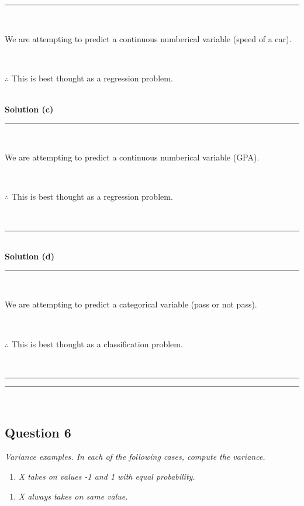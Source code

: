 \documentclass{article}
\begin{document}
\noindent\rule{\textwidth}{0.4pt}\\

\parbox{\textwidth}{We are attempting to predict a continuous numberical variable (speed of a car).}\\

\parbox{\textwidth}{$\therefore$ This is best thought as a regression problem.}\\

\textbf{Solution (c)}

\noindent\rule{\textwidth}{0.4pt}\\

\parbox{\textwidth}{We are attempting to predict a continuous numberical variable (GPA).}\\

\parbox{\textwidth}{$\therefore$ This is best thought as a regression problem.}\\

\noindent\rule{\textwidth}{0.4pt}\\

\textbf{Solution (d)}

\noindent\rule{\textwidth}{0.4pt}\\

\parbox{\textwidth}{We are attempting to predict a categorical variable (pass or not pass).}\\

\parbox{\textwidth}{$\therefore$ This is best thought as a classification problem.}\\

\noindent\rule{\textwidth}{0.4pt}

\noindent\rule{\textwidth}{0.4pt}\\

\newpage

\subsection*{Question 6}
\textit{Variance examples. In each of the following cases, compute the variance.}\\

\begin{enumerate}[label=(a)]
  \item \textit{X takes on values -1 and 1 with equal probability.}
\end{enumerate}

\begin{enumerate}[label=(b)]
  \item \textit{X always takes on same value.}
\end{enumerate}
\end{document}
